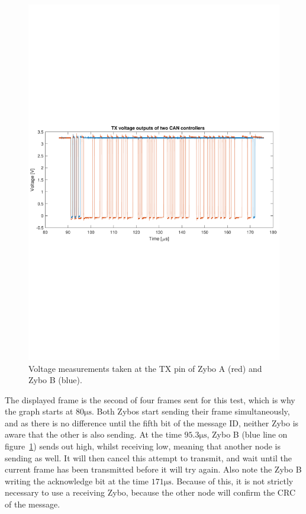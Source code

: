 \begin{figure}[h]
	\centering
	\includegraphics[width = \linewidth]{graphics/CAN_test3_2TX}
	\caption{Voltage measurements taken at the TX pin of Zybo A (red) and Zybo B (blue).}
	\label{fig:CAN_test3_2TX}
\end{figure}

The displayed frame is the second of four frames sent for this test, which is why the graph starts at $80 \si{\micro\second}$.
Both Zybos start sending their frame simultaneously, and as there is no difference until the fifth bit of the message ID, neither Zybo is aware that the other is also sending.
At the time $95.3\si{\micro\second}$, Zybo B (blue line on figure~\ref{fig:CAN_test3_2TX}) sends out high, whilst receiving low, meaning that another node is sending as well. 
It will then cancel this attempt to transmit, and wait until the current frame has been transmitted before it will try again.
Also note the Zybo B writing the acknowledge bit at the time $171 \si{\micro\second}$.
Because of this, it is not strictly necessary to use a receiving Zybo, because the other node will confirm the CRC of the message.\\

